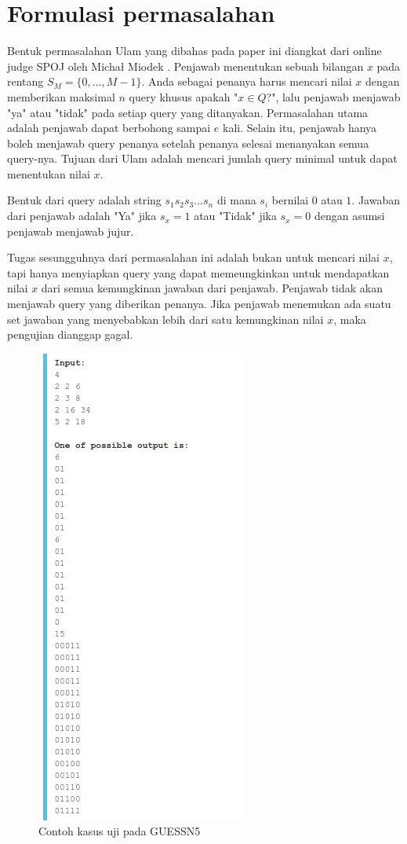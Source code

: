 \section{Formulasi permasalahan}

Bentuk permasalahan Ulam yang dibahas pada paper ini diangkat dari online judge SPOJ oleh Micha\l{} Miodek \cite{guessn5}. Penjawab menentukan sebuah bilangan $x$ pada rentang $S_M=\{0,\ldots,M-1\}$. Anda sebagai penanya harus mencari nilai $x$ dengan memberikan maksimal $n$ query khusus apakah "$x \in Q$?", lalu penjawab menjawab "ya" atau "tidak" pada setiap query yang ditanyakan. Permasalahan utama adalah penjawab dapat berbohong sampai $e$ kali. Selain itu, penjawab hanya boleh menjawab query penanya setelah penanya selesai menanyakan semua query-nya. Tujuan dari Ulam adalah mencari jumlah query minimal untuk dapat menentukan nilai $x$.

Bentuk dari query adalah string $s_1s_2s_3\ldots s_n$ di mana $s_i$ bernilai $0$ atau $1$. Jawaban dari penjawab adalah "Ya" jika $s_x=1$ atau "Tidak" jika $s_x=0$ dengan asumsi penjawab menjawab jujur.

Tugas sesungguhnya dari permasalahan ini adalah bukan untuk mencari nilai $x$, tapi hanya menyiapkan query yang dapat memeungkinkan untuk mendapatkan nilai $x$ dari semua kemungkinan jawaban dari penjawab. Penjawab tidak akan menjawab query yang diberikan penanya. Jika penjawab menemukan ada suatu set jawaban yang menyebabkan lebih dari satu kemungkinan nilai $x$, maka pengujian dianggap gagal.

\begin{figure}
\centering
\includegraphics[scale=0.43]{../img/example.png}
\caption{Contoh kasus uji pada GUESSN5}
\label{fig:guessn5_test_case}
\end{figure}

